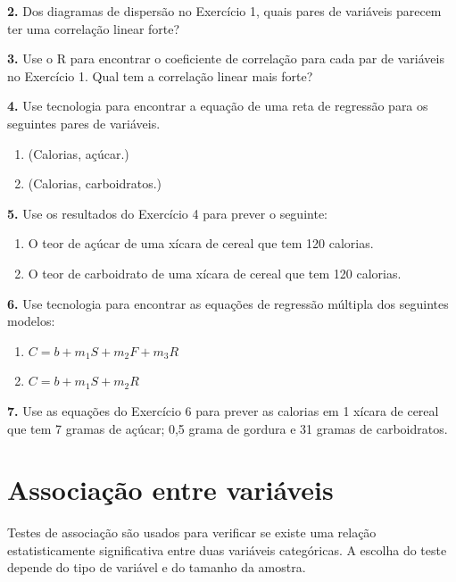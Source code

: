 \documentclass[
]{book}
\providecommand{\tightlist}{%
  \setlength{\itemsep}{0pt}\setlength{\parskip}{0pt}}
\begin{document}
\textbf{2.} Dos diagramas de dispersão no Exercício 1, quais pares de variáveis parecem ter uma correlação linear forte?

\textbf{3.} Use o R para encontrar o coeficiente de correlação para cada par de variáveis no Exercício 1. Qual tem a correlação linear mais forte?

\textbf{4.} Use tecnologia para encontrar a equação de uma reta de regressão para os seguintes pares de variáveis.

\begin{enumerate}
\def\labelenumi{(\alph{enumi})}
\tightlist
\item
  (Calorias, açúcar.)\\
\item
  (Calorias, carboidratos.)
\end{enumerate}

\textbf{5.} Use os resultados do Exercício 4 para prever o seguinte:

\begin{enumerate}
\def\labelenumi{(\alph{enumi})}
\tightlist
\item
  O teor de açúcar de uma xícara de cereal que tem 120 calorias.\\
\item
  O teor de carboidrato de uma xícara de cereal que tem 120 calorias.
\end{enumerate}

\textbf{6.} Use tecnologia para encontrar as equações de regressão múltipla dos seguintes modelos:

\begin{enumerate}
\def\labelenumi{(\alph{enumi})}
\tightlist
\item
  \(C = b + m_1S + m_2F + m_3R\)\\
\item
  \(C = b + m_1S + m_2R\)
\end{enumerate}

\textbf{7.} Use as equações do Exercício 6 para prever as calorias em 1 xícara de cereal que tem 7 gramas de açúcar; 0,5 grama de gordura e 31 gramas de carboidratos.

\chapter{Associação entre variáveis}\label{associauxe7uxe3o-entre-variuxe1veis}

Testes de associação são usados para verificar se existe uma relação estatisticamente significativa entre duas variáveis categóricas. A escolha do teste depende do tipo de variável e do tamanho da amostra.
\end{document}
